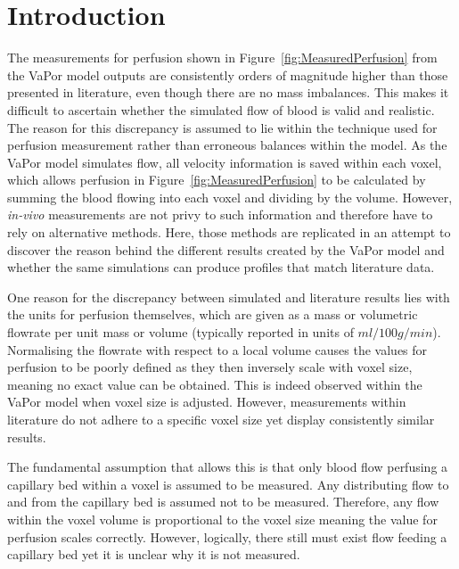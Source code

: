 \documentclass[11pt,english,a4paper,twoside,openright]{report}
\begin{document}
{{{{{{{{\section[Introduction]{{\Large I}ntroduction}

The measurements for perfusion shown in Figure~\ref{fig:MeasuredPerfusion} from the VaPor model outputs are consistently orders of magnitude higher than those presented in literature, even though there are no mass imbalances. This makes it difficult to ascertain whether the simulated flow of blood is valid and realistic. The reason for this discrepancy is assumed to lie within the technique used for perfusion measurement rather than erroneous balances within the model. As the VaPor model simulates flow, all velocity information is saved within each voxel, which allows perfusion in Figure~\ref{fig:MeasuredPerfusion} to be calculated by summing the blood flowing into each voxel and dividing by the volume. However, \textit{in-vivo} measurements are not privy to such information and therefore have to rely on alternative methods. Here, those methods are replicated in an attempt to discover the reason behind the different results created by the VaPor model and whether the same simulations can produce profiles that match literature data.

One reason for the discrepancy between simulated and literature results lies with the units for perfusion themselves, which are given as a mass or volumetric flowrate per unit mass or volume (typically reported in units of $ml/100g/min$). Normalising the flowrate with respect to a local volume causes the values for perfusion to be poorly defined as they then inversely scale with voxel size, meaning no exact value can be obtained. This is indeed observed within the VaPor model when voxel size is adjusted. However, measurements within literature do not adhere to a specific voxel size yet display consistently similar results.

The fundamental assumption that allows this is that only blood flow perfusing a capillary bed within a voxel is assumed to be measured. Any distributing flow to and from the capillary bed is assumed not to be measured. Therefore, any flow within the voxel volume is proportional to the voxel size meaning the value for perfusion scales correctly. However, logically, there still must exist flow feeding a capillary bed yet it is unclear why it is not measured. 

}}}}}}}}
\end{document}
